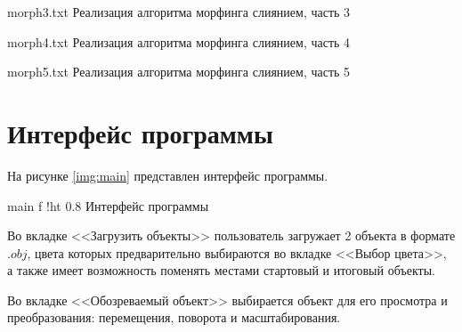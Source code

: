 \clearpage

{morph3.txt}
{Реализация алгоритма морфинга слиянием, часть 3}

\clearpage

{morph4.txt}
{Реализация алгоритма морфинга слиянием, часть 4}

\clearpage

{morph5.txt}
{Реализация алгоритма морфинга слиянием, часть 5}

\clearpage

\section{Интерфейс программы}

На рисунке \ref{img:main} представлен интерфейс программы.

{main}
{f}
{!ht}
{0.8\textwidth}
{Интерфейс программы}

Во вкладке <<Загрузить объекты>> пользователь загружает 2 объекта в формате $.obj$, цвета которых предварительно выбираются во вкладке <<Выбор цвета>>, а также имеет возможность поменять местами стартовый и итоговый объекты.

Во вкладке <<Обозреваемый объект>> выбирается объект для его просмотра и преобразования: перемещения, поворота и масштабирования.

\clearpage




